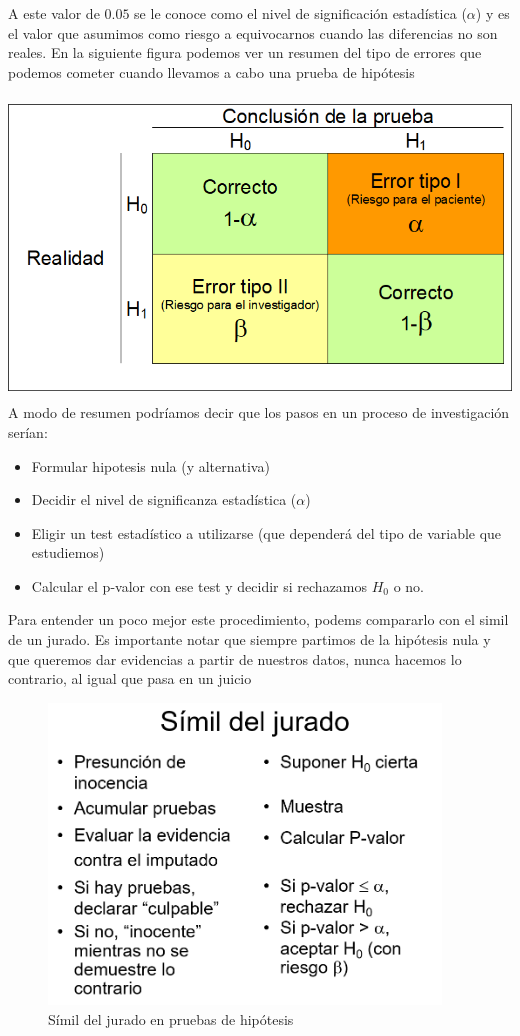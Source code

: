 \documentclass[
]{book}
\providecommand{\tightlist}{%
  \setlength{\itemsep}{0pt}\setlength{\parskip}{0pt}}
\begin{document}
A este valor de \(0.05\) se le conoce como el nivel de significación estadística (\(\alpha\)) y es el valor que asumimos como riesgo a equivocarnos cuando las diferencias no son reales. En la siguiente figura podemos ver un resumen del tipo de errores que podemos cometer cuando llevamos a cabo una prueba de hipótesis

\includegraphics[width=\textwidth,height=8cm]{figures/errores.png}
A modo de resumen podríamos decir que los pasos en un proceso de investigación serían:

\begin{itemize}
\tightlist
\item
  Formular hipotesis nula (y alternativa)
\item
  Decidir el nivel de significanza estadística (\(\alpha\))
\item
  Eligir un test estadístico a utilizarse (que dependerá del tipo de variable que estudiemos)
\item
  Calcular el p-valor con ese test y decidir si rechazamos \(H_0\) o no.
\end{itemize}

Para entender un poco mejor este procedimiento, podems compararlo con el simil de un jurado. Es importante notar que siempre partimos de la hipótesis nula y que queremos dar evidencias a partir de nuestros datos, nunca hacemos lo contrario, al igual que pasa en un juicio

\begin{figure}
\centering
\includegraphics[width=\textwidth,height=8cm]{figures/simil_jurado.png}
\caption{Símil del jurado en pruebas de hipótesis}
\end{figure}
\end{document}
